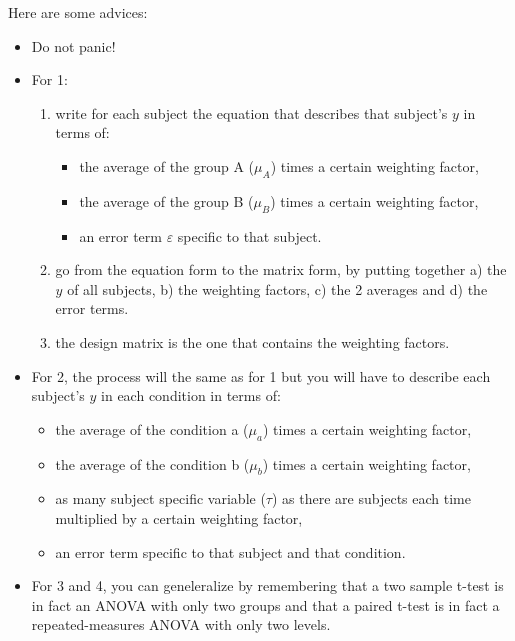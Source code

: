 \documentclass[a4paper,10pt]{article}
\begin{document}
Here are some advices:
\begin{itemize}
 \item Do not panic!
 \item For 1: 
  \begin{enumerate}
    \item write for each subject the equation that describes that subject's $y$ in terms of:
      \begin{itemize}
	\item the average of the group A ($\mu_{A}$) times a certain weighting factor, 
	\item the average of the group B ($\mu_{B}$) times a certain weighting factor,
	\item an error term $\varepsilon$ specific to that subject.
      \end{itemize}
    \item go from the equation form to the matrix form, by putting together a) the $y$ of all subjects, b) the weighting factors, c) the 2 averages and d) the error terms.
    \item the design matrix is the one that contains the weighting factors.
  \end{enumerate}
  
 \item For 2, the process will the same as for 1 but you will have to describe each subject's $y$ in each condition in terms of:
    \begin{itemize}
      \item the average of the condition a ($\mu_{a}$) times a certain weighting factor, 
      \item the average of the condition b ($\mu_{b}$) times a certain weighting factor,
      \item as many subject specific variable ($\tau$) as there are subjects each time multiplied by a certain weighting factor,
      \item an error term specific to that subject and that condition.
    \end{itemize}

    \item For 3 and 4, you can geneleralize by remembering that a two sample t-test is in fact an ANOVA with only two groups and that a paired t-test is in fact a repeated-measures ANOVA with only two levels.
\end{itemize}
\end{document}

